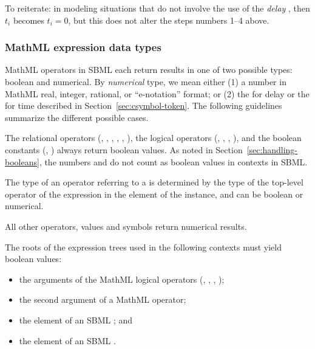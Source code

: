To reiterate: in modeling situations that do not involve the use
of the \emph{delay} , then $t_i$ becomes $t_i = 0$,
but this does not alter the steps numbers 1--4 above.


\subsubsection{MathML expression data types}
\label{sec:mathmltype}

MathML operators in SBML each return results in one of two
possible types: boolean and numerical.  By
\emph{numerical} type, we mean either (1) a number in
  MathML real, integer, rational, or ``e-notation'' format;
or (2) the  for delay or the
   for time described in
  Section~\ref{sec:csymbol-token}.  The following guidelines
summarize the different possible cases.

The relational operators (, , ,
, , ), the logical operators
(, , , ), and the
boolean constants (, ) always return
boolean values.  As noted in
  Section~\ref{sec:handling-booleans}, the numbers  and
   do not count as boolean values in \mathml
  contexts in SBML.

The type of an operator referring to a \FunctionDefinition is
determined by the type of the top-level operator of the expression
in the  element of the \FunctionDefinition
instance, and can be boolean or numerical.

All other operators, values and symbols return numerical
results.

The roots of the expression trees used in the following contexts
must yield boolean values:

\begin{itemize}\setlength{\parskip}{-0.2ex}

\item the arguments of the MathML logical operators (,
, , );

\item the second argument of a MathML  operator;

\item the  element of an SBML \Event; and

\item the  element of an SBML \Constraint.

\end{itemize}

